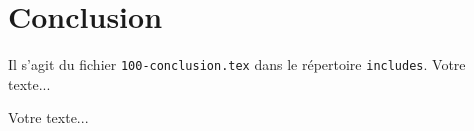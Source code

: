 

\newpage

\section{Conclusion}

Il s'agit du fichier \texttt{100-conclusion.tex} dans le répertoire \texttt{includes}. Votre texte...

Votre texte...


